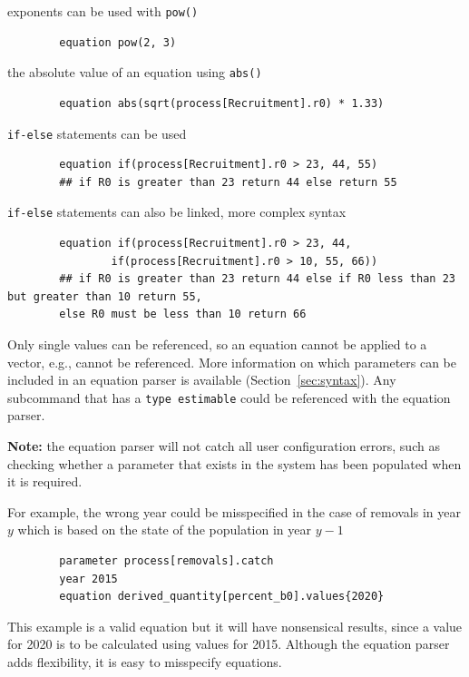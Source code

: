 exponents can be used with \texttt{pow()}

{\small{\begin{verbatim}
		equation pow(2, 3)
\end{verbatim}}}

the absolute value of an equation using \texttt{abs()}

{\small{\begin{verbatim}
		equation abs(sqrt(process[Recruitment].r0) * 1.33)
\end{verbatim}}}

\texttt{if-else} statements can be used

{\small{\begin{verbatim}
		equation if(process[Recruitment].r0 > 23, 44, 55)
		## if R0 is greater than 23 return 44 else return 55
\end{verbatim}}}

\texttt{if-else} statements can also be linked, more complex syntax

{\small{\begin{verbatim}
		equation if(process[Recruitment].r0 > 23, 44,
         		if(process[Recruitment].r0 > 10, 55, 66))
		## if R0 is greater than 23 return 44 else if R0 less than 23 but greater than 10 return 55,
		else R0 must be less than 10 return 66
\end{verbatim}}}

Only single values can be referenced, so an equation cannot be applied to a vector, e.g.,  cannot be referenced. More information on which parameters can be included in an equation parser is available (Section~\ref{sec:syntax}). Any subcommand that has a \texttt{type estimable} could be referenced with the equation parser.

\textbf{Note:} the equation parser will not catch all user configuration errors, such as checking whether a parameter that exists in the system has been populated when it is required.

For example, the wrong year could be misspecified in the case of removals in year $y$ which is based on the state of the population in year $y-1$

{\small{\begin{verbatim}
		parameter process[removals].catch
		year 2015
		equation derived_quantity[percent_b0].values{2020}
\end{verbatim}}}

This example is a valid equation but it will have nonsensical results, since a value for 2020 is to be calculated using values for 2015. Although the equation parser adds flexibility, it is easy to misspecify equations.


